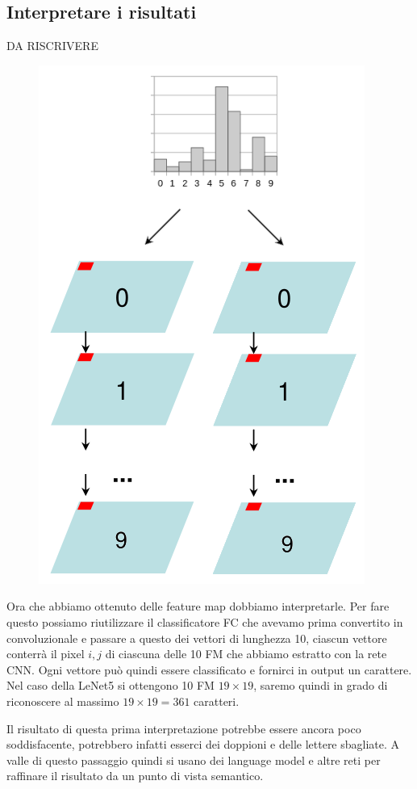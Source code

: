\subsection{Interpretare i risultati}
{\Huge DA RISCRIVERE}

\begin{figure}
	\vspace{-.25cm}
	\centering
	\includegraphics[width=\linewidth]{Picture/Post_CNN}
\end{figure}
Ora che abbiamo ottenuto delle feature map dobbiamo interpretarle. Per fare questo possiamo riutilizzare il classificatore FC che avevamo prima convertito in convoluzionale e passare a questo dei vettori di lunghezza 10, ciascun vettore conterrà il pixel $i,j$ di ciascuna delle 10 FM che abbiamo estratto con la rete CNN. Ogni vettore può quindi essere classificato e fornirci in output un carattere. Nel caso della LeNet5 si ottengono 10 FM $19\times19$, saremo quindi in grado di riconoscere al massimo $19\times19 = 361$ caratteri.

 Il risultato di questa prima interpretazione potrebbe essere ancora poco soddisfacente, potrebbero infatti esserci dei doppioni e delle lettere sbagliate. A valle di questo passaggio quindi si usano dei language model e altre reti per raffinare il risultato da un punto di vista semantico. 
 